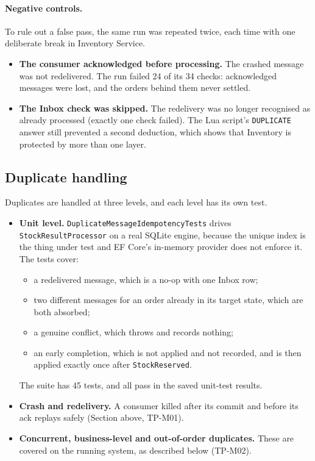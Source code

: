 \documentclass[a4paper]{report}
\begin{document}
\paragraph{Negative controls.} To rule out a false pass, the same run was
repeated twice, each time with one deliberate break in Inventory Service.

\begin{itemize}
  \item \textbf{The consumer acknowledged before processing.} The crashed
    message was not redelivered. The run failed 24 of its 34 checks:
    acknowledged messages were lost, and the orders behind them never
    settled.
  \item \textbf{The Inbox check was skipped.} The redelivery was no longer
    recognised as already processed (exactly one check failed). The Lua script's
    \texttt{DUPLICATE} answer still prevented a second deduction, which
    shows that Inventory is protected by more than one layer.
\end{itemize}

\subsection{Duplicate handling}

Duplicates are handled at three levels, and each level has its own test.

\begin{itemize}
  \item \textbf{Unit level.} \texttt{DuplicateMessageIdempotencyTests}
    drives \texttt{StockResultProcessor} on a real SQLite engine, because the
    unique index is the thing under test and EF Core's in-memory provider
    does not enforce it. The tests cover:
    \begin{itemize}
      \item a redelivered message, which is a no-op with one Inbox row;
      \item two different messages for an order already in its target state,
        which are both absorbed;
      \item a genuine conflict, which throws and records nothing;
      \item an early completion, which is not applied and not recorded, and
        is then applied exactly once after \texttt{StockReserved}.
    \end{itemize}
    The suite has 45 tests, and all pass in the saved unit-test results.
  \item \textbf{Crash and redelivery.} A consumer killed after its commit and
    before its ack replays safely (Section above, TP-M01).
  \item \textbf{Concurrent, business-level and out-of-order duplicates.}
    These are covered on the running system, as described below (TP-M02).
\end{itemize}
\end{document}
